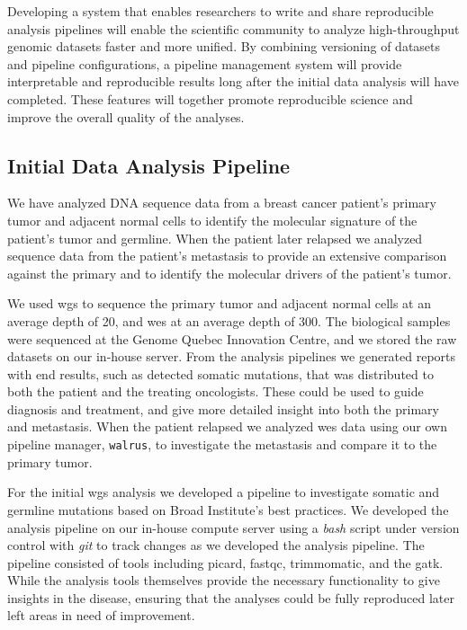 Developing a system that enables researchers to write and share reproducible
analysis pipelines will enable the scientific community to analyze
high-throughput genomic datasets faster and more unified. By combining
versioning of datasets and pipeline configurations, a pipeline management system
will provide interpretable and reproducible results long after the initial data
analysis will have completed. These features will together promote reproducible
science and improve the overall quality of the analyses. 

\subsection{Initial Data Analysis Pipeline} 
We have analyzed DNA sequence data from a breast cancer patient's
primary tumor and adjacent normal cells to identify the molecular signature of
the patient's tumor and germline. When the patient  later relapsed we analyzed
sequence data from the patient's metastasis to provide an extensive comparison
against the primary and to identify the molecular drivers of the patient's
tumor. 

We used \gls{wgs} to sequence the primary tumor and adjacent normal cells at an
average depth of 20, and \gls{wes} at an average depth of 300. The biological
samples were sequenced at the Genome Quebec Innovation Centre, and we stored the
raw datasets on our in-house server.  From the analysis pipelines we generated
reports with end results, such as detected somatic mutations, that was
distributed to both the patient and the treating oncologists. These could be
used to guide diagnosis and treatment, and give more detailed insight into both
the primary and metastasis.  When the patient relapsed we analyzed \gls{wes}
data using our own pipeline manager, \texttt{walrus}, to investigate the
metastasis and compare it to the primary tumor. 

For the initial \gls{wgs} analysis we developed a pipeline to investigate
somatic and germline mutations based on Broad Institute's best practices. We
developed the analysis pipeline on our in-house compute server using a
\emph{bash} script under version control with \emph{git} to track changes as we
developed the analysis pipeline. The pipeline consisted of tools including
picard\cite{picard}, fastqc\cite{fastqc}, trimmomatic\cite{trimmomatic}, and the
\gls{gatk}.\cite{gatk} While the analysis tools themselves provide the necessary
functionality to give insights in the disease, 
ensuring that the analyses could be fully reproduced later left areas in need of
improvement.

